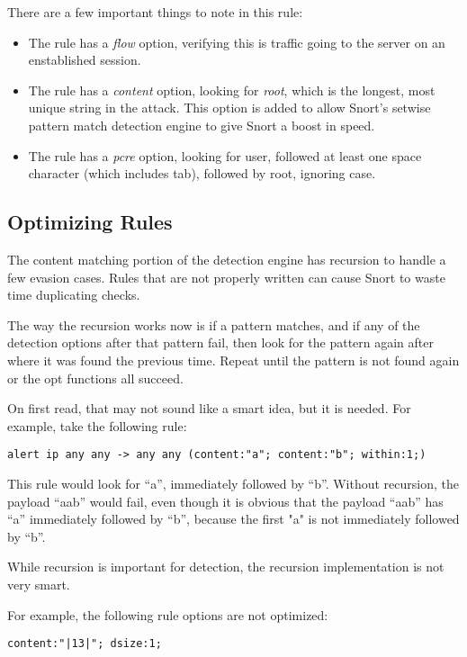 \documentclass[english]{report}
\begin{document}
There are a few important things to note in this rule:
\begin{itemize}
\item The rule has a \emph{flow} option, verifying this is traffic going to the server on an enstablished session.
\item The rule has a \emph{content} option, looking for \emph{root}, which is
the longest, most unique string in the attack.  This option is added to allow
Snort's setwise pattern match detection engine to give Snort a boost in speed.
\item The rule has a \emph{pcre} option, looking for user, followed at least one space character (which includes tab), followed by root, ignoring case.
\end{itemize}

\subsection{Optimizing Rules}

The content matching portion of the detection engine has recursion to handle a
few evasion cases.  Rules that are not properly written can cause Snort to
waste time duplicating checks.

The way the recursion works now is if a pattern matches, and if any of the
detection options after that pattern fail, then look for the pattern again
after where it was found the previous time.  Repeat until the pattern is not
found again or the opt functions all succeed.

On first read, that may not sound like a smart idea, but it is needed.  For example, take the following rule:

\begin{verbatim}
alert ip any any -> any any (content:"a"; content:"b"; within:1;)
\end{verbatim}

This rule would look for ``a'', immediately followed by ``b''.  Without recursion,
the payload ``aab'' would fail, even though it is obvious that the payload ``aab''
has ``a'' immediately followed by ``b'', because the first "a" is not
immediately followed by ``b''.

While recursion is important for detection, the recursion implementation is not
very smart.

For example, the following rule options are not optimized:
\begin{verbatim}
content:"|13|"; dsize:1;
\end{verbatim}
\end{document}
